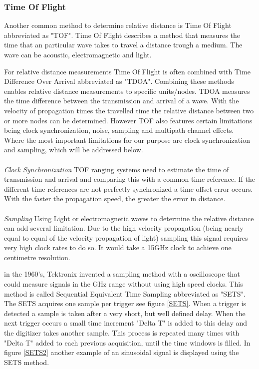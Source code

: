 \documentclass[10pt,a4paper]{article}
\begin{document}
\subsubsection{Time Of Flight}
Another common method to determine relative distance is Time Of Flight abbreviated as "TOF". Time Of Flight describes a method that measures the time that an particular wave takes to travel a distance trough a medium. The wave can be acoustic, electromagnetic and light.

For relative distance measurements Time Of Flight is often combined with Time Difference Over Arrival abbreviated as "TDOA". Combining these methods enables relative distance measurements to specific units/nodes. TDOA measures the time difference between the transmission and arrival of a wave. With the velocity of propagation times the travelled time the relative distance between two or more nodes can be determined. However TOF also features certain limitations being clock synchronization, noise, sampling and multipath channel effects.\cite{TOF} Where the most important limitations for our purpose are clock synchronization and sampling, which will be addressed below.
\\\\
\textit{Clock Synchronization}
TOF ranging systems need to estimate the time of transmission and arrival and comparing this with a common time reference.\cite{TOF} If the different time references are not perfectly synchronized a time offset error occurs. With the faster the propagation speed, the greater the error in distance. 
\\\\
\textit{Sampling}
Using Light or electromagnetic waves to determine the relative distance can add several limitation. Due to the high velocity propagation (being nearly equal to equal of the velocity propagation of light) sampling this signal requires very high clock rates to do so. It would take a 15GHz clock to achieve one centimetre resolution.\cite{Arduino}

in the 1960's, Tektronix invented a sampling method with a oscilloscope that could measure signals in the GHz range without using high speed clocks. This method is called Sequential Equivalent Time Sampling abbreviated as "SETS". The SETS acquires one sample per trigger see figure \ref{SETS}. When a trigger is detected a sample is taken after a very short, but well defined delay. When the next trigger occurs a small time increment "Delta T" is added to this delay and the digitizer takes another sample. This process is repeated many times with "Delta T" added to each previous acquisition, until the time windows is filled.\cite{SETS} In figure \ref{SETS2} another example of an sinusoidal signal is displayed using the SETS method. 
\end{document}
